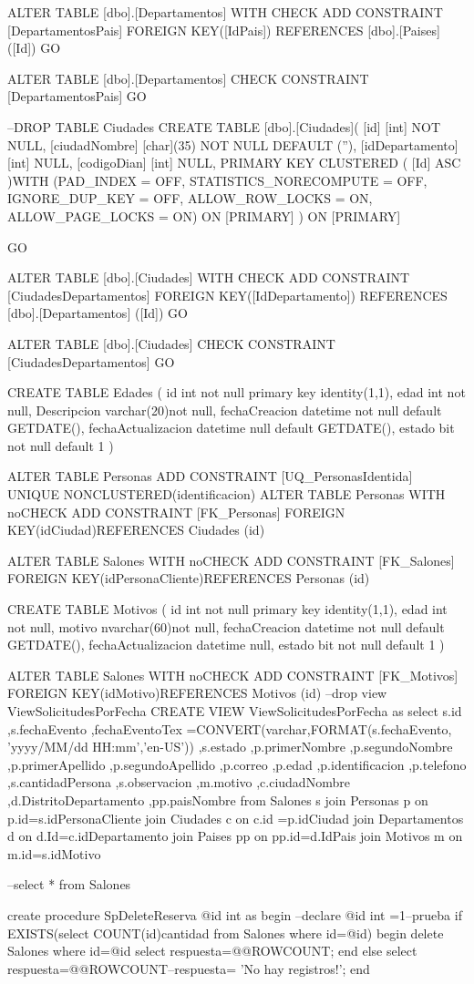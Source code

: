 ALTER TABLE [dbo].[Departamentos]  WITH CHECK ADD  CONSTRAINT [DepartamentosPais] FOREIGN KEY([IdPais])
REFERENCES [dbo].[Paises] ([Id])
GO

ALTER TABLE [dbo].[Departamentos] CHECK CONSTRAINT [DepartamentosPais]
GO

--DROP TABLE Ciudades
CREATE TABLE [dbo].[Ciudades](
	[id] [int] NOT NULL,
	[ciudadNombre] [char](35) NOT NULL DEFAULT (''),
	[idDepartamento] [int] NULL,
	[codigoDian] [int] NULL,
PRIMARY KEY CLUSTERED 
(
	[Id] ASC
)WITH (PAD_INDEX = OFF, STATISTICS_NORECOMPUTE = OFF, IGNORE_DUP_KEY = OFF, ALLOW_ROW_LOCKS = ON, ALLOW_PAGE_LOCKS = ON) ON [PRIMARY]
) ON [PRIMARY]

GO

ALTER TABLE [dbo].[Ciudades]  WITH CHECK ADD  CONSTRAINT [CiudadesDepartamentos] FOREIGN KEY([IdDepartamento])
REFERENCES [dbo].[Departamentos] ([Id])
GO

ALTER TABLE [dbo].[Ciudades] CHECK CONSTRAINT [CiudadesDepartamentos]
GO

CREATE TABLE Edades
(
	id int not null primary key identity(1,1),
	edad int not null,
	Descripcion varchar(20)not null,
    fechaCreacion datetime not null default GETDATE(),
	fechaActualizacion datetime null default GETDATE(),
    estado bit not null default 1
)

ALTER TABLE Personas ADD  CONSTRAINT [UQ_PersonasIdentida] UNIQUE NONCLUSTERED(identificacion)
ALTER TABLE Personas  WITH noCHECK ADD  CONSTRAINT [FK_Personas] FOREIGN KEY(idCiudad)REFERENCES Ciudades (id)

ALTER TABLE Salones  WITH noCHECK ADD  CONSTRAINT [FK_Salones] FOREIGN KEY(idPersonaCliente)REFERENCES Personas (id)


CREATE TABLE Motivos
(
	id int not null primary key identity(1,1),
	edad int not null,
	motivo nvarchar(60)not null,
    fechaCreacion datetime not null default GETDATE(),
	fechaActualizacion datetime null,
    estado bit not null default 1
)


ALTER TABLE Salones  WITH noCHECK ADD  CONSTRAINT [FK_Motivos] FOREIGN KEY(idMotivo)REFERENCES Motivos (id)
--drop view ViewSolicitudesPorFecha
CREATE VIEW  ViewSolicitudesPorFecha as
select s.id
,s.fechaEvento
,fechaEventoTex =CONVERT(varchar,FORMAT(s.fechaEvento, 'yyyy/MM/dd HH:mm','en-US'))
,s.estado
,p.primerNombre
,p.segundoNombre
,p.primerApellido
,p.segundoApellido
,p.correo
,p.edad
,p.identificacion
,p.telefono
,s.cantidadPersona
,s.observacion
,m.motivo
,c.ciudadNombre
,d.DistritoDepartamento
,pp.paisNombre
from Salones s
join Personas p on p.id=s.idPersonaCliente
join Ciudades c on c.id =p.idCiudad
join Departamentos d on d.Id=c.idDepartamento
join Paises pp on pp.id=d.IdPais
join Motivos m on m.id=s.idMotivo


--select * from Salones

create procedure SpDeleteReserva
@id int 
as
begin 
--declare @id int =1--prueba 
if EXISTS(select COUNT(id)cantidad from Salones where id=@id)
	begin
	delete Salones where id=@id 
	select respuesta=@@ROWCOUNT; 
	end
else 
	select respuesta=@@ROWCOUNT--respuesta= 'No hay registros!';
end